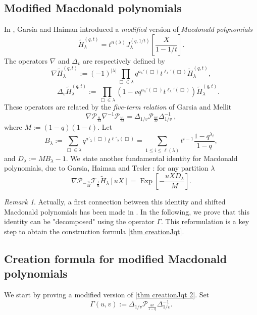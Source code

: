 \documentclass[12pt]{amsart}
\theoremstyle{remark}
\newtheorem{rmq}{Remark}
\newcommand{\tH}{\widetilde{H}^{(q,t)}}
\newcommand{\Pop}{\mathcal{P}}
\newcommand{\Top}{\mathcal{T}}
\DeclareMathOperator{\Exp}{Exp}
\begin{document}
\subsection{Modified Macdonald polynomials}\label{ssec modified Macdonald}
In \cite{GarsiaHaiman1993}, Garsia and Haiman introduced a \emph{modified} version of \emph{Macdonald polynomials} 
$$\tH_\lambda=t^{n(\lambda)}J_\lambda^{(q,1/t)}\left[\frac{X}{1-1/t}\right].$$
The operators $\nabla$ and $\Delta_v$  are respectively defined by
\begin{equation}
  \nabla \tH_{\lambda}:=(-1)^{|\lambda|}\prod_{\Box\in\lambda}q^{a_\lambda'(\Box)}t^{\ell_\lambda'(\Box)}\tH_\lambda,  \label{eq def nabla}
\end{equation}
\begin{equation}
\qquad \Delta_{v} \tH_{\lambda}:=\prod_{\Box\in\lambda}\left(1-vq^{a_\lambda'(\Box)}t^{\ell_\lambda'(\Box)}\right)\tH_\lambda.\label{eq def delta}    
\end{equation}
These operators are related by the \textit{five-term relation} of Garsia and Mellit \cite{GarsiaMellit2019}
\begin{equation}\label{eq:fiveterm}
\nabla \Pop_{\frac{u}{M}}\nabla^{-1}\Pop_{\frac{uv}{M}}=\Delta_{1/v}\Pop_{\frac{uv}{M}}\Delta_{1/v}^{-1}\ ,
\end{equation}
where $M:=(1-q)(1-t)$. Let 
$$B_\lambda:=\sum_{\Box \in\lambda}q^{a'_\lambda(\Box)}t^{\ell'_\lambda(\Box)}=\sum_{1\leq i\leq \ell(\lambda)}t^{i-1}\frac{1-q^{\lambda_i}}{1-q},$$ and $D_\lambda:=M B_\lambda-1.$ We state another fundamental identity for Macdonald polynomials, due to Garsia, Haiman and Tesler \cite{GarsiaHaimanTesler2001}: for any partition $\lambda$
\begin{equation} \label{thm Tesler}
\nabla \Pop_{-\frac{u}{M}}\Top_{\frac{1}{u}} \widetilde{H}_\lambda[uX]=\Exp\left[-\frac{uXD_\lambda}{M} \right].
\end{equation}

\begin{rmq}
    Actually, a first connection between this identity and shifted Macdonald polynomials has been made in \cite[Theorem 3.2]{GarsiaHaimanTesler2001}. In the following, we prove that this identity can be "decomposed" using the operator $\Gamma$. This reformulation is a key step to obtain the construction formula \cref{thm creationJqt}.
\end{rmq}

\subsection{Creation formula for modified Macdonald polynomials}
We start by proving a modified version of \cref{thm creationJqt 2}.
Set \[\Gamma(u,v):=\Delta_{1/v}\Pop_{\frac{uv}{1-q}}\Delta_{1/v}^{-1}.\]
\end{document}
